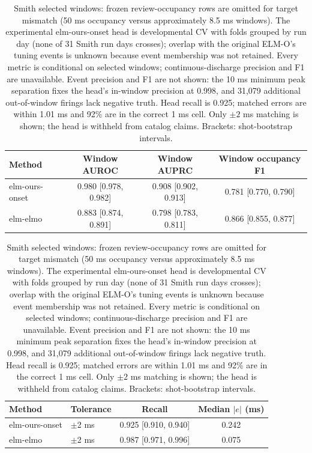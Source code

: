 \begin{table}[t]
\centering
\small
\begin{tabular}{lccc}
\toprule
Method & Window AUROC & Window AUPRC & Window occupancy F1 \\
\midrule
elm-ours-onset & 0.980 {\scriptsize[0.978, 0.982]} & 0.908 {\scriptsize[0.902, 0.913]} & 0.781 {\scriptsize[0.770, 0.790]} \\
elm-elmo & 0.883 {\scriptsize[0.874, 0.891]} & 0.798 {\scriptsize[0.783, 0.811]} & 0.866 {\scriptsize[0.855, 0.877]} \\
\bottomrule\end{tabular}\par\smallskip
\begin{tabular}{llcc}
\toprule
Method & Tolerance & Recall & Median $|e|$ (ms) \\
\midrule
elm-ours-onset & $\pm$2 ms & 0.925 {\scriptsize[0.910, 0.940]} & 0.242 \\
elm-elmo & $\pm$2 ms & 0.987 {\scriptsize[0.971, 0.996]} & 0.075 \\
\bottomrule\end{tabular}\caption{Smith selected windows: frozen review-occupancy rows are omitted for target mismatch (50 ms occupancy versus approximately 8.5 ms windows). The experimental elm-ours-onset head is developmental CV with folds grouped by run day (none of 31 Smith run days crosses); overlap with the original ELM-O's tuning events is unknown because event membership was not retained. Every metric is conditional on selected windows; continuous-discharge precision and F1 are unavailable. Event precision and F1 are not shown: the 10 ms minimum peak separation fixes the head's in-window precision at 0.998, and 31,079 additional out-of-window firings lack negative truth. Head recall is 0.925; matched errors are within 1.01 ms and 92\% are in the correct 1 ms cell. Only $\pm2$ ms matching is shown; the head is withheld from catalog claims. Brackets: shot-bootstrap intervals.}
\label{tab:elm-smith}
\end{table}
